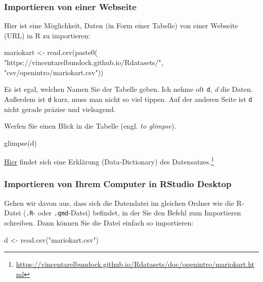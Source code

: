 \documentclass[
  letterpaper,
]{scrbook}
\newenvironment{Shaded}{\begin{snugshade}}{\end{snugshade}}
\newcommand{\FunctionTok}[1]{\textcolor[rgb]{0.28,0.35,0.67}{#1}}
\newcommand{\NormalTok}[1]{\textcolor[rgb]{0.00,0.23,0.31}{#1}}
\newcommand{\OtherTok}[1]{\textcolor[rgb]{0.00,0.23,0.31}{#1}}
\newcommand{\StringTok}[1]{\textcolor[rgb]{0.13,0.47,0.30}{#1}}
\theoremstyle{definition}
\theoremstyle{definition}
\theoremstyle{definition}
\theoremstyle{remark}
\begin{document}
\subsubsection{Importieren von einer
Webseite}\label{importieren-von-einer-webseite}

Hier ist eine Möglichkeit, Daten (in Form einer Tabelle) von einer
Webseite (URL) in R zu importieren:

\begin{Shaded}
\begin{Highlighting}[]
\NormalTok{mariokart }\OtherTok{\textless{}{-}} \FunctionTok{read.csv}\NormalTok{(}\FunctionTok{paste0}\NormalTok{(}
  \StringTok{"https://vincentarelbundock.github.io/Rdatasets/"}\NormalTok{,}
  \StringTok{"csv/openintro/mariokart.csv"}\NormalTok{))}
\end{Highlighting}
\end{Shaded}

Es ist egal, welchen Namen Sie der Tabelle geben. Ich nehme oft
\texttt{d}, \emph{d} die Daten. Außerdem ist \texttt{d} kurz, muss man
nicht so viel tippen. Auf der anderen Seite ist \texttt{d} nicht gerade
präzise und vielsagend.

Werfen Sie einen Blick in die Tabelle (engl. \emph{to glimpse}).

\begin{Shaded}
\begin{Highlighting}[]
\FunctionTok{glimpse}\NormalTok{(d)}
\end{Highlighting}
\end{Shaded}

\href{https://vincentarelbundock.github.io/Rdatasets/doc/openintro/mariokart.html}{Hier}
findet sich eine Erklärung (Data-Dictionary) des Datensatzes.\footnote{\url{https://vincentarelbundock.github.io/Rdatasets/doc/openintro/mariokart.html}}

\subsubsection{Importieren von Ihrem Computer in RStudio
Desktop}\label{importieren-von-ihrem-computer-in-rstudio-desktop}

Gehen wir davon aus, dass sich die Datendatei im gleichen Ordner wie die
R-Datei (\texttt{.R}- oder \texttt{.qmd}-Datei) befindet, in der Sie den
Befehl zum Importieren schreiben. Dann können Sie die Datei einfach so
importieren:

\begin{Shaded}
\begin{Highlighting}[]
\NormalTok{d }\OtherTok{\textless{}{-}} \FunctionTok{read.csv}\NormalTok{(}\StringTok{"mariokart.csv"}\NormalTok{)}
\end{Highlighting}
\end{Shaded}
\end{document}

